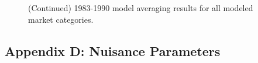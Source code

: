 \documentclass[12pt]{article}
\begin{document}
\begin{landscape}
\begin{figure}
{\begin{minipage}[c]{0.3\textwidth}
\end{minipage}}
\caption{(Continued) 1983-1990 model averaging results for all modeled market categories.}
\label{colorTabApp832}
\end{figure}
\end{landscape}

%
\clearpage
%

\subsection{Appendix D: Nuisance Parameters}\label{appNu}
\end{document}

